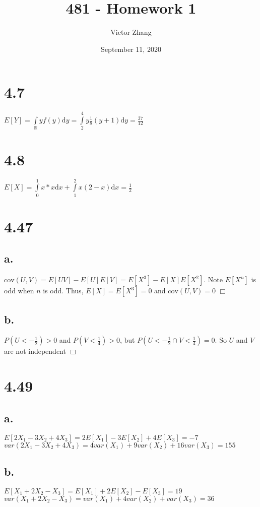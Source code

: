 \documentclass{article}
\title{481 - Homework 1}
\author{Victor Zhang}
\date{September 11, 2020}
\begin{document}
\maketitle

\section*{4.7}
$E[Y] = \int\limits_\mathbb{R} y f(y) \textrm{d}y = \int\limits_2^4 y\frac{1}{8}(y+1)\textrm{d}y = \frac{37}{12}$

\section*{4.8}
$E[X] = \int\limits_0^1 x*x \textrm{d}x + \int\limits_1^2 x(2-x) \textrm{d}x = \frac{1}{2}$

\section*{4.47}
\subsection*{a.}
$\textrm{cov}(U,V) = E[UV] - E[U]E[V] = E[X^3] - E[X]E[X^2]$. Note $E[X^n]$ is odd when $n$ is odd. Thus, $E[X] = E[X^3] = 0$ and $\textrm{cov}(U,V) = 0$ $\Box$

\subsection*{b.}
$P(U < -\frac{1}{2}) > 0$ and $P(V < \frac{1}{4}) > 0$, but $P(U < -\frac{1}{2} \cap V < \frac{1}{4}) = 0$. So $U$ and $V$ are not independent $\Box$

\section*{4.49}
\subsection*{a.}
$E[2X_1 - 3X_2 + 4X_3] = 2E[X_1] - 3E[X_2] + 4E[X_3] = -7$\\
$var(2X_1 - 3X_2 + 4X_3) = 4 var(X_1) + 9 var(X_2) + 16 var(X_3) = 155$

\subsection*{b.}
$E[X_1 + 2X_2 - X_3] = E[X_1] + 2E[X_2] - E[X_3] = 19$\\
$var(X_1 + 2X_2 - X_3) = var(X_1) + 4 var(X_2) + var(X_3) = 36$
\end{document}
